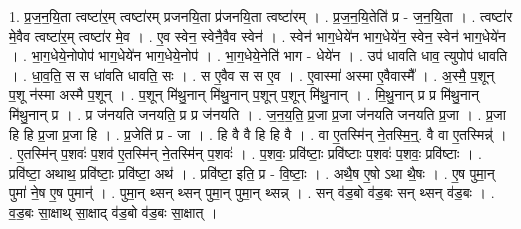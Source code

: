 \documentclass[17pt]{extarticle}
\begin{document}
1. प्र॒ज॒न॒यि॒ता त्वष्टा॑र॒म् त्वष्टा॑रम् प्रजनयि॒ता प्र॑जनयि॒ता त्वष्टा॑रम् । . प्र॒ज॒न॒यि॒तेति॑ प्र - ज॒न॒यि॒ता । . त्वष्टा॑र मे॒वैव त्वष्टा॑र॒म् त्वष्टा॑र मे॒व । . ए॒व स्वेन॒ स्वेनै॒वैव स्वेन॑ । . स्वेन॑ भाग॒धेये॑न भाग॒धेये॑न॒ स्वेन॒ स्वेन॑ भाग॒धेये॑न । . भा॒ग॒धेये॒नोपोप॑ भाग॒धेये॑न भाग॒धेये॒नोप॑ । . भा॒ग॒धेये॒नेति॑ भाग - धेये॑न । . उप॑ धावति धाव॒ त्युपोप॑ धावति । . धा॒व॒ति॒ स स धा॑वति धावति॒ सः । . स ए॒वैव स स ए॒व । . ए॒वास्मा॑ अस्मा ए॒वैवास्मै᳚ । . अ॒स्मै॒ प॒शून् प॒शू न॑स्मा अस्मै प॒शून् । . प॒शून् मि॑थु॒नान् मि॑थु॒नान् प॒शून् प॒शून् मि॑थु॒नान् । . मि॒थु॒नान् प्र प्र मि॑थु॒नान् मि॑थु॒नान् प्र । . प्र ज॑नयति जनयति॒ प्र प्र ज॑नयति । . ज॒न॒य॒ति॒ प्र॒जा प्र॒जा ज॑नयति जनयति प्र॒जा । . प्र॒जा हि हि प्र॒जा प्र॒जा हि । . प्र॒जेति॑ प्र - जा । . हि वै वै हि हि वै । . वा ए॒तस्मि॑न् ने॒तस्मि॒न्॒. वै वा ए॒तस्मिन्न्॑ । . ए॒तस्मि॑न् प॒शवः॑ प॒शव॑ ए॒तस्मि॑न् ने॒तस्मि॑न् प॒शवः॑ । . प॒शवः॒ प्रवि॑ष्टाः॒ प्रवि॑ष्टाः प॒शवः॑ प॒शवः॒ प्रवि॑ष्टाः । . प्रवि॑ष्टा॒ अथाथ॒ प्रवि॑ष्टाः॒ प्रवि॑ष्टा॒ अथ॑ । . प्रवि॑ष्टा॒ इति॒ प्र - वि॒ष्टाः॒ । . अथै॒ष ए॒षो ऽथा थै॒षः । . ए॒ष पुमा॒न् पुमा॑ ने॒ष ए॒ष पुमान्॑ । . पुमा॒न् थ्सन् थ्सन् पुमा॒न् पुमा॒न् थ्सन्न् । . सन् व॑ड॒बो व॑ड॒बः सन् थ्सन् व॑ड॒बः । . व॒ड॒बः सा॒क्षाथ् सा॒क्षाद् व॑ड॒बो व॑ड॒बः सा॒क्षात् । \newline
\end{document}

